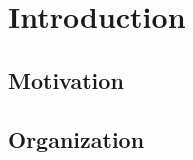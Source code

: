 \chapter{Introduction}
\thispagestyle{chapterBeginStyle}


\section{Motivation}

\section{Organization}
